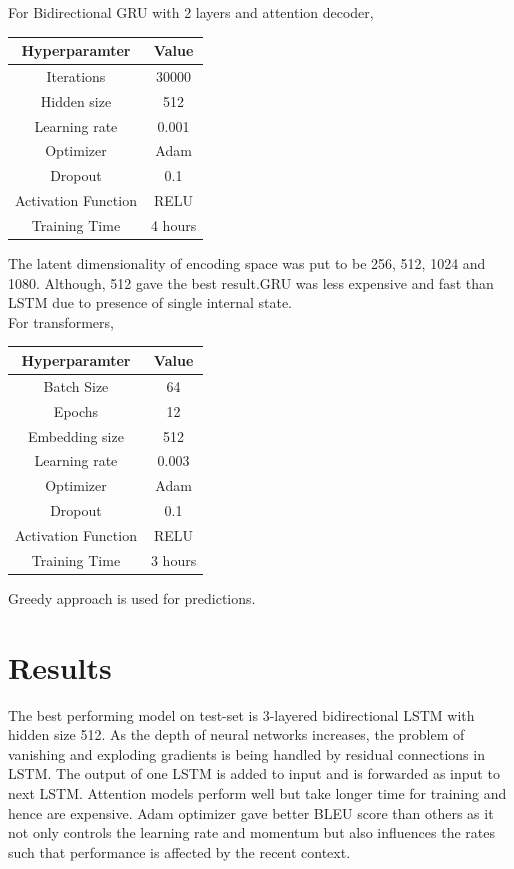 \documentclass[11pt, oneside]{article}   	%
\begin{document}
\bigskip

For Bidirectional GRU with 2 layers and attention decoder,
\begin{center}
\begin{tabular}{ ||c|c|| } 
 \hline
 Hyperparamter & Value \\ [0.5ex] 
 \hline\hline
 Iterations & 30000\\
 \hline
 Hidden size & 512\\ 
 \hline
 Learning rate & 0.001 \\
 \hline
 Optimizer & Adam\\
 \hline
 Dropout & 0.1\\
 \hline
 Activation Function & RELU \\
 \hline
  Training Time & 4 hours\\
 \hline
\end{tabular}
\end{center}

The latent dimensionality of encoding space was put to be 256, 512, 1024 and 1080. Although, 512 gave the best result.GRU was less expensive and fast than LSTM due to presence of single internal 
state.\\

\medskip
For transformers,
\begin{center}
\begin{tabular}{ ||c|c|| } 
 \hline
 Hyperparamter & Value \\ [0.5ex] 
 \hline\hline
 Batch Size & 64 \\
 \hline 
 Epochs & 12  \\ 
 \hline
 Embedding size & 512\\ 
 \hline
 Learning rate & 0.003 \\
 \hline
 Optimizer & Adam\\
 \hline
 Dropout & 0.1\\
 \hline
  Activation Function & RELU \\
 \hline
 Training Time & 3 hours\\
 \hline
\end{tabular}
\end{center}

\medskip
Greedy approach is used for predictions.

\section{Results}

The best performing model on test-set is 3-layered bidirectional LSTM with hidden size 512. As the depth of neural networks increases, the problem of vanishing and exploding gradients is being handled by residual connections in LSTM. The output of one LSTM is added to input and is forwarded as input to next LSTM. Attention models perform well but take longer time for training and hence are expensive. Adam optimizer gave better BLEU score than others as it not only controls the learning rate and momentum but also influences the rates such that performance is affected by the recent context.
\end{document}
